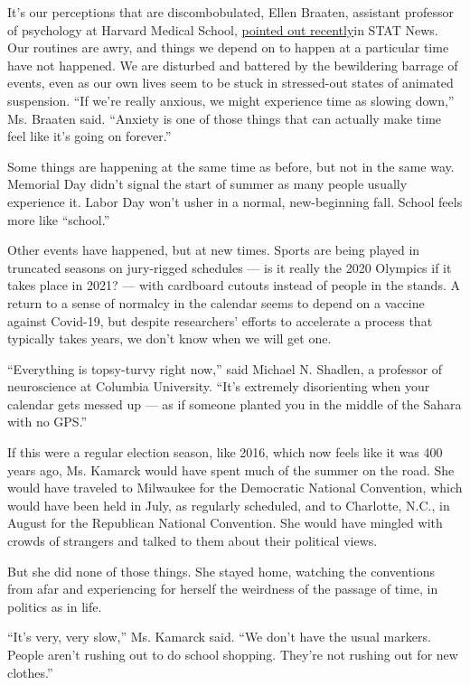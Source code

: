 It's our perceptions that are discombobulated, Ellen Braaten, assistant
professor of psychology at Harvard Medical School,
\href{https://www.statnews.com/2020/08/17/pandemic-stress-alters-your-perception-of-time/}{pointed
out recently}in STAT News. Our routines are awry, and things we depend
on to happen at a particular time have not happened. We are disturbed
and battered by the bewildering barrage of events, even as our own lives
seem to be stuck in stressed-out states of animated suspension. ``If
we're really anxious, we might experience time as slowing down,'' Ms.
Braaten said. ``Anxiety is one of those things that can actually make
time feel like it's going on forever.''

Some things are happening at the same time as before, but not in the
same way. Memorial Day didn't signal the start of summer as many people
usually experience it. Labor Day won't usher in a normal, new-beginning
fall. School feels more like ``school.''

Other events have happened, but at new times. Sports are being played in
truncated seasons on jury-rigged schedules --- is it really the 2020
Olympics if it takes place in 2021? --- with cardboard cutouts instead
of people in the stands. A return to a sense of normalcy in the calendar
seems to depend on a vaccine against Covid-19, but despite researchers'
efforts to accelerate a process that typically takes years, we don't
know when we will get one.

``Everything is topsy-turvy right now,'' said Michael N. Shadlen, a
professor of neuroscience at Columbia University. ``It's extremely
disorienting when your calendar gets messed up --- as if someone planted
you in the middle of the Sahara with no GPS.''

If this were a regular election season, like 2016, which now feels like
it was 400 years ago, Ms. Kamarck would have spent much of the summer on
the road. She would have traveled to Milwaukee for the Democratic
National Convention, which would have been held in July, as regularly
scheduled, and to Charlotte, N.C., in August for the Republican National
Convention. She would have mingled with crowds of strangers and talked
to them about their political views.

But she did none of those things. She stayed home, watching the
conventions from afar and experiencing for herself the weirdness of the
passage of time, in politics as in life.

``It's very, very slow,'' Ms. Kamarck said. ``We don't have the usual
markers. People aren't rushing out to do school shopping. They're not
rushing out for new clothes.''

